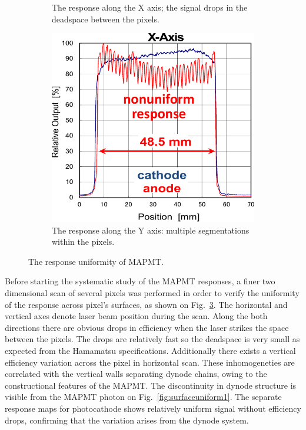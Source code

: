 \documentclass[5p,times,preprint]{elsarticle}
\begin{document}
\begin{figure}[b]
\begin{subfigure}{0.3\linewidth}
		\caption{The response along the X axis; the signal drops in the deadspace between the pixels.}
		\label{fig:surfaceuniform2}
	\end{subfigure}
	\quad
	\begin{subfigure}{0.3\linewidth}
		\includegraphics[width=\textwidth]{surfaceuniform2.pdf}
		\caption{The response along the Y axis: multiple segmentations within the pixels.}
		\label{fig:surfaceuniform3}
	\end{subfigure}
	\caption{The response uniformity of MAPMT.}
	\label{fig:surfaceuniform}
\end{figure}


Before starting the systematic study of the MAPMT responses, a finer two dimensional scan of several pixels was performed in order to verify the uniformity of the response across pixel's surfaces, as shown on Fig.~\ref{fig:surfaceuniform}.
The horizontal and vertical axes denote laser beam position during the scan.
Along the both directions there are obvious drops in efficiency when the laser strikes the space between the pixels.
The drops are relatively fast so the deadspace is very small as expected from the Hamamatsu specifications.
Additionally there exists a vertical efficiency variation across the pixel in horizontal scan.
These inhomogeneties are correlated with the vertical walls separating dynode chains, owing to the constructional features of the MAPMT. The discontinuity in dynode structure is visible from the MAPMT photon on Fig.~\ref{fig:surfaceuniform1}.
The separate response maps for photocathode shows relatively uniform signal without efficiency drops, confirming that the variation arises from the dynode system.
\end{document}
